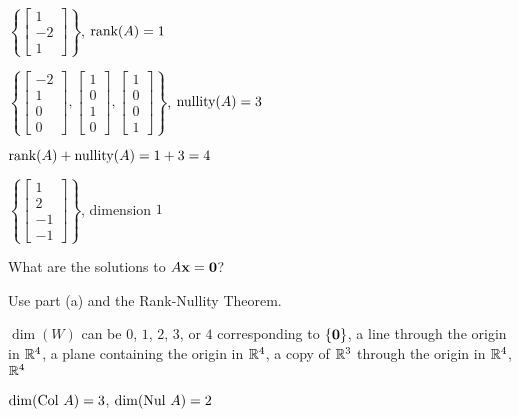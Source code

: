 \begin{multicols}{2}
\ea
	
\item 
\ba
\item $\left\{ \left[ \begin{array}{r} 1 \\ -2 \\ 1 \end{array} \right] \right\}$, $\text{rank}(A) = 1$ 

\item $\left\{ \left[ \begin{array}{r} -2\\1\\0\\0 \end{array} \right], \left[ \begin{array}{c} 1\\0\\1\\0 \end{array} \right], \left[ \begin{array}{c} 1\\0\\0\\1 \end{array} \right] \right\}$,  $\text{nullity}(A) = 3$

\item $\text{rank}(A) + \text{nullity}(A) = 1+3 = 4$

\item $\left\{ \left[ \begin{array}{r} 1\\2\\-1\\-1 \end{array} \right] \right\}$, dimension $1$ 

	\ea

\item 
\ba
\item What are the solutions to $A \mathbf{x} = \mathbf{0}$? 

\item Use part (a) and the Rank-Nullity Theorem.  

\ea

\item $\dim(W)$ can be $0$, $1$, $2$, $3$, or $4$ corresponding to $\{\mathbf{0}\}$, a line through the origin in $\mathbb{R}^4$, a plane containing the origin in $\mathbb{R}^4$,  a copy of $\mathbb{R}^3$ through the origin in $\mathbb{R}^4$, $\mathbb{R}^4$ 

\item  $\dim(\text{Col } A) = 3$, $\dim(\text{Nul } A) = 2$



\end{multicols}
